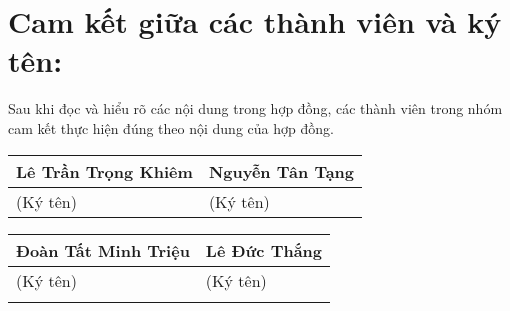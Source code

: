 \documentclass[]{article}
\begin{document}
\section{\texorpdfstring{\textbf{Cam kết giữa các thành viên và ký
tên:}}{Cam kết giữa các thành viên và ký tên:}}\label{cam-kux1ebft-giux1eefa-cuxe1c-thuxe0nh-viuxean-vuxe0-kuxfd-tuxean}

Sau khi đọc và hiểu rõ các nội dung trong hợp đồng, các thành viên trong
nhóm cam kết thực hiện đúng theo nội dung của hợp đồng.

\begin{longtable}[]{@{}ll@{}}
\toprule
Lê Trần Trọng Khiêm & Nguyễn Tân Tạng\tabularnewline
\midrule
\endhead
(Ký tên) & (Ký tên)\tabularnewline
\bottomrule
\end{longtable}

\begin{longtable}[]{@{}ll@{}}
\toprule
Đoàn Tất Minh Triệu & Lê Đức Thắng\tabularnewline
\midrule
\endhead
(Ký tên) & (Ký tên)\tabularnewline
&\tabularnewline
\bottomrule
\end{longtable}
\end{document}
